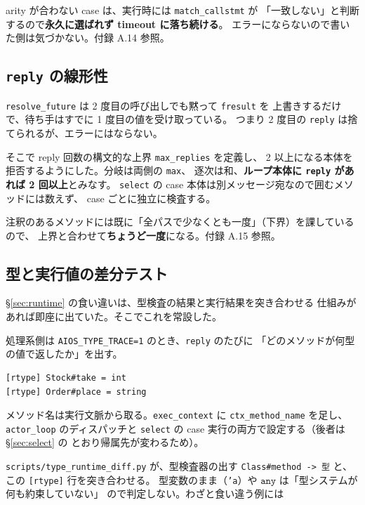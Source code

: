 \documentclass[11pt,a4paper]{ltjsarticle}
\theoremstyle{definition}
\theoremstyle{remark}
\newcommand{\ty}[1]{\ensuremath{\mathtt{#1}}}
\begin{document}
arity が合わない case は、実行時には \texttt{match\_callstmt} が
「一致しない」と判断するので\textbf{永久に選ばれず timeout に落ち続ける}。
エラーにならないので書いた側は気づかない。付録 A.14 参照。

\subsection{\texttt{reply} の線形性}

\texttt{resolve\_future} は 2 度目の呼び出しでも黙って \texttt{fresult} を
上書きするだけで、待ち手はすでに 1 度目の値を受け取っている。
つまり 2 度目の \texttt{reply} は捨てられるが、エラーにはならない。

そこで reply 回数の構文的な上界 \texttt{max\_replies} を定義し、
2 以上になる本体を拒否するようにした。分岐は両側の \texttt{max}、
逐次は和、\textbf{ループ本体に \texttt{reply} があれば 2 回以上}とみなす。
\texttt{select} の case 本体は別メッセージ宛なので囲むメソッドには数えず、
case ごとに独立に検査する。

注釈のあるメソッドには既に「全パスで少なくとも一度」（下界）を課しているので、
上界と合わせて\textbf{ちょうど一度}になる。付録 A.15 参照。

\subsection{型と実行値の差分テスト}
\label{sec:difftest}

\S\ref{sec:runtime} の食い違いは、型検査の結果と実行結果を突き合わせる
仕組みがあれば即座に出ていた。そこでこれを常設した。

処理系側は \texttt{AIOS\_TYPE\_TRACE=1} のとき、\texttt{reply} のたびに
「どのメソッドが何型の値で返したか」を出す。

\begin{lstlisting}[language={}]
[rtype] Stock#take = int
[rtype] Order#place = string
\end{lstlisting}

メソッド名は実行文脈から取る。\texttt{exec\_context} に
\texttt{ctx\_method\_name} を足し、\texttt{actor\_loop} のディスパッチと
\texttt{select} の case 実行の両方で設定する（後者は \S\ref{sec:select} の
とおり帰属先が変わるため）。

\texttt{scripts/type\_runtime\_diff.py} が、型検査器の出す
\texttt{Class\#method -> 型} と、この \texttt{[rtype]} 行を突き合わせる。
型変数のまま（\texttt{'a}）や \ty{any} は「型システムが何も約束していない」
ので判定しない。わざと食い違う例には
\end{document}

